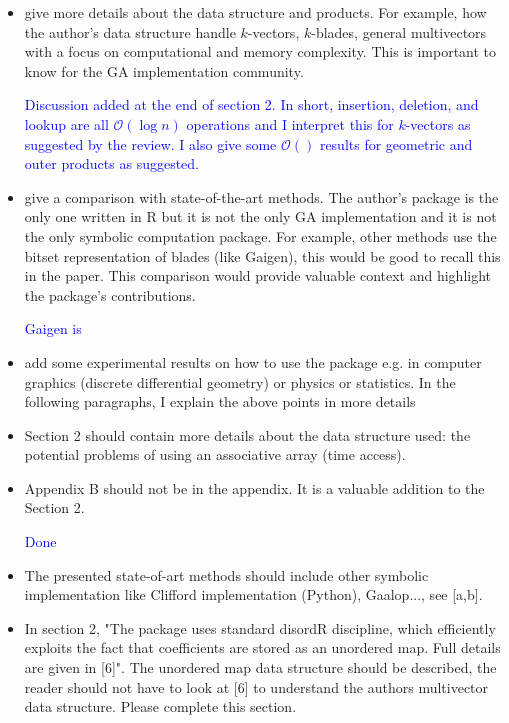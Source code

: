 \documentclass{article}
\begin{document}
\begin{itemize}
\item give more details about the data structure and products.  For
  example, how the author's data structure handle $k$-vectors,
  $k$-blades, general multivectors with a focus on computational and
  memory complexity.  This is important to know for the GA
  implementation community.

\textcolor{blue}{Discussion added at the end of section 2.  In short,
  insertion, deletion, and lookup are all $\mathcal{O}(\log n)$
  operations and I interpret this for $k$-vectors as suggested by the
  review.  I also give some $\mathcal{O}()$ results for geometric and
  outer products as suggested.}

\item give a comparison with state-of-the-art methods.  The author's
  package is the only one written in R but it is not the only GA
  implementation and it is not the only symbolic computation
  package.  For example, other methods use the bitset representation of
  blades (like Gaigen), this would be good to recall this in the
  paper.  This comparison would provide valuable context and highlight
  the package's contributions.

\textcolor{blue}{Gaigen is}
  
\item add some experimental results on how to use the package e.g. in
  computer graphics (discrete differential geometry) or physics or
  statistics.  In the following paragraphs, I explain the above points
  in more details

\item Section 2 should contain more details about the data structure
  used: the potential problems of using an associative array (time
  access).

\item Appendix B should not be in the appendix.  It is a valuable
  addition to the Section 2.

  \textcolor{blue}{Done}
  
\item The presented state-of-art methods should include other symbolic
  implementation like Clifford implementation (Python), Gaalop..., see
  [a,b].

\item In section 2, "The package uses standard disordR discipline,
  which efficiently exploits the fact that coefficients are stored as
  an unordered map.  Full details are given in [6]".  The unordered
  map data structure should be described, the reader should not have
  to look at [6] to understand the authors multivector data
  structure. Please complete this section.


\end{itemize}
\end{document}
